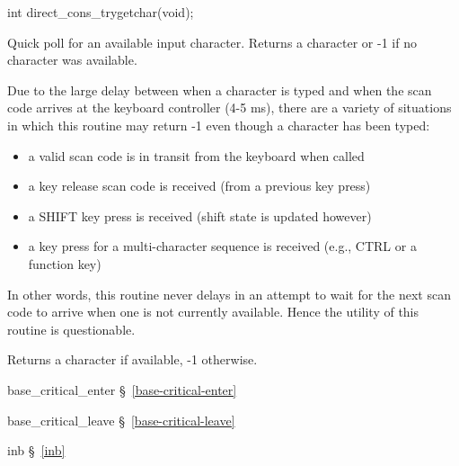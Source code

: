 \label{direct-cons-trygetchar}
\begin{apisyn}

	\funcproto int direct_cons_trygetchar(void);
\end{apisyn}
\begin{apidesc}
	Quick poll for an available input character.
	Returns a character or -1 if no character was available.

	Due to the large delay between when a character is typed
	and when the scan code arrives at the keyboard controller (4-5 ms),
	there are a variety of situations in which this routine may
	return -1 even though a character has been typed:
	\begin{itemize}
	\item	a valid scan code is in transit from the keyboard when called
	\item	a key release scan code is received
		(from a previous key press)
	\item	a SHIFT key press is received
		(shift state is updated however)
	\item	a key press for a multi-character sequence is received
		(e.g., CTRL or a function key)
	\end{itemize}
	In other words, this routine never delays in an attempt to wait
	for the next scan code to arrive when one is not currently available.
	Hence the utility of this routine is questionable.
\end{apidesc}
\begin{apiret}
	Returns a character if available, -1 otherwise.
\end{apiret}
\begin{apidep}
	\item[base_critical_enter]	\S~\ref{base-critical-enter}
	\item[base_critical_leave]	\S~\ref{base-critical-leave}
	\item[inb]	\S~\ref{inb}
\end{apidep}


